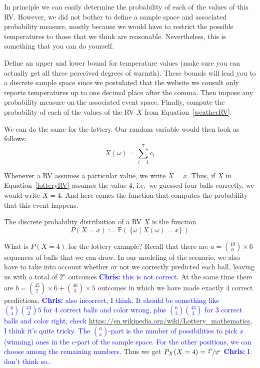\documentclass[a4paper,11pt,leqno]{report}
\newcommand{\chris}[1]{ \textcolor{blue}{\textbf{Chris:} #1}}
\begin{document}
In principle we can easily determine the probability of each of the values of this RV. However, we did
not bother to define a sample space and associated probability measure, mostly because we would have to
restrict the possible temperatures to those that we think are reasonable. Nevertheless, this is something
that you can do yourself.

\begin{Exercise}
Define an upper and lower bound for temperature values (make sure you can actually get all three perceived
degrees of warmth). These bounds will lead you to a discrete sample space since we postulated
that the website we consult only reports temperatures up to one decimal place after the comma. Then impose
any probability measure on the associated event space. Finally, compute the probability of each of the
values of the RV $ X $ from Equation~\eqref{weatherRV}.
\end{Exercise}

We can do the same for the lottery. Our random variable would then look as follows:
\begin{equation}\label{lotteryRV}
X(\omega) = \overset{7}{\underset{i=1}{\sum}} c_{i}
\end{equation}

Whenever a RV assumes a particular value, we write $ X=x $. Thus, if $ X $ in Equation~\eqref{lotteryRV} assumes the
value $ 4 $, i.e.\ we guessed four balls correctly, we would write $ X=4 $. And here comes the function
that computes the probability that this event happens.

\begin{Definition}
The discrete probability distribution of a RV $ X $ is the function
$$ P(X=x) := \mathbb{P}( \, \{\omega \mid X(\omega)=x\} \, ) $$
\end{Definition}

What is $ P(X=4) $ for the lottery example? Recall that there are 
$ a = \binom{49}{6} \times 6 $ sequences of balls that we can draw. In our modeling of the scenario, we also have to take
into account whether or not we correctly predicted each ball, leaving us with a total of $ 2^{a} $
outcomes\chris{this is not correct}. At the same time there are $ b = \binom{45}{2} \times 6 + \binom{46}{3} \times 5 $ outcomes in which we have made 
exactly 4 correct predictions.\chris{also incorrect, I think. It should be something like $\binom{6}{4} \binom{43}{2} 5$ for 4 correct balls and color wrong, plus $\binom{6}{3}\binom{43}{3}$ for 3 correct balls and color right, check \url{https://en.wikipedia.org/wiki/Lottery_mathematics}, I think it's quite tricky. The $\binom{6}{x}$-part is the number of possibilities to pick $x$ (winning) ones in the $c$-part of the sample space. For the other positions, we can choose among the remaining numbers.} Thus we get $ P_{X}(X=4) = \nicefrac{2^{b}}{2^{a}} $ \chris{I don't think so.}.
\end{document}
